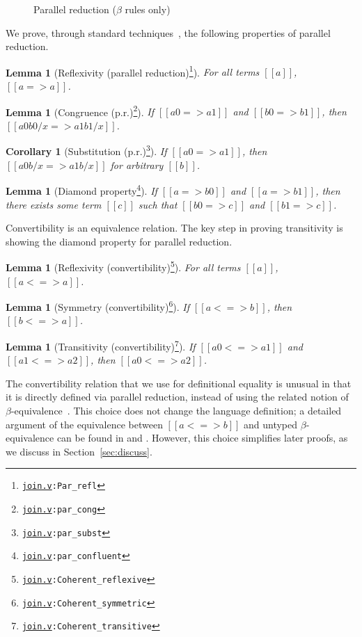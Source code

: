\documentclass[\ifpublic nolinenum\else\fi,online,OA]{jfp}
\newcommand{\dotv}[2]{\href{#1}{\texttt{#1}}{\texttt{:#2}}}
\newtheorem{lemma}[theorem]{Lemma}
\newtheorem{corollary}[theorem]{Corollary}
\theoremstyle{definition}
\begin{document}
\begin{figure}
\caption{Parallel reduction ($\beta$ rules only) }
\label{fig:par}
\end{figure}

We prove, through standard
techniques~\citep{takahashi-parallel-reduction,plfa22.08}, the following
properties of parallel reduction.

\begin{lemma}[Reflexivity (parallel reduction)\footnote{\dotv{join.v}{Par\_refl}}]
  \label{lemma:parrefl}
  For all terms $[[a]]$, $[[a => a]]$.
\end{lemma}
\begin{lemma}[Congruence (p.r.)\footnote{\dotv{join.v}{par\_cong}}]
  \label{lemma:parcong}
  If $[[a0 => a1]]$ and $[[b0 => b1]]$, then $[[a0 { b0 / x } => a1 {
    b1 / x }]]$.
\end{lemma}
\begin{corollary}[Substitution (p.r.)\footnote{\dotv{join.v}{par\_subst}}]
  \label{lemma:parsubst}
  If $[[a0 => a1]]$, then $[[a0 {b / x } => a1 {b / x}]]$ for arbitrary $[[b]]$.
\end{corollary}
\begin{lemma}[Diamond property\footnote{\dotv{join.v}{par\_confluent}}]
  \label{lemma:pardiamond}
  If $[[a => b0]]$ and $[[a => b1]]$, then there exists some term
  $[[c]]$ such that $[[b0 => c]]$ and $[[b1 => c]]$.
\end{lemma}

Convertibility is an equivalence relation. The key step in
proving transitivity is showing the diamond property for parallel reduction.

\begin{lemma}[Reflexivity (convertibility)\footnote{\dotv{join.v}{Coherent\_reflexive}}]
  \label{lemma:coherencerefl}
  For all terms $[[a]]$, $[[a <=> a]]$.
\end{lemma}
\begin{lemma}[Symmetry (convertibility)\footnote{\dotv{join.v}{Coherent\_symmetric}}]
  \label{lemma:coherencesym}
  If $[[a <=> b]]$, then $[[b <=> a]]$.
\end{lemma}
\begin{lemma}[Transitivity (convertibility)\footnote{\dotv{join.v}{Coherent\_transitive}}]
  \label{lemma:coherencetrans}
  If $[[a0 <=> a1]]$ and $[[a1 <=> a2]]$, then $[[a0 <=> a2]]$.
\end{lemma}

The convertibility relation that we use for definitional equality is unusual
in that it is directly defined via parallel reduction, instead of using the
related notion of $\beta$-equivalence~\citep{barendregt1991introduction,coquand1990:cic}.
This choice does not change the language definition; a detailed argument of the
equivalence between $[[a <=> b]]$ and untyped $\beta$-equivalence can be found
in \citet{barendregt:lambda-calculi-with-types} and
\citet{takahashi-parallel-reduction}. However, this choice simplifies later
proofs, as we discuss in Section~\ref{sec:discuss}.
\end{document}
